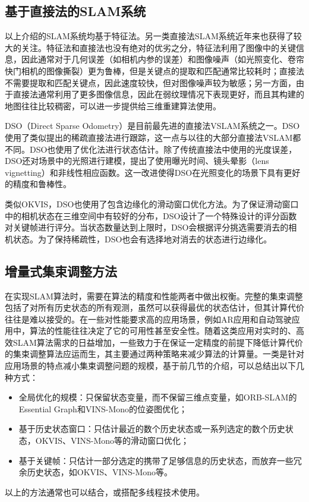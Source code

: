 \subsection{基于直接法的SLAM系统}

以上介绍的SLAM系统均基于特征法。另一类直接法SLAM系统近年来也获得了较大的关注。特征法和直接法也没有绝对的优劣之分，特征法利用了图像中的关键信息，因此通常对于几何误差（如相机内参的误差）和图像噪声（如光照变化、卷帘快门相机的图像撕裂）更为鲁棒，但是关键点的提取和匹配通常比较耗时；直接法不需要提取和匹配关键点，因此速度较快，但对图像噪声较为敏感；另一方面，由于直接法通常利用了更多图像信息，因此在弱纹理情况下表现更好，而且其构建的地图往往比较稠密，可以进一步提供给三维重建算法使用。

DSO（Direct Sparse Odometry）\citep{engel2018direct}是目前最先进的直接法VSLAM系统之一。DSO使用了类似\citep{jin2003semi}提出的稀疏直接法进行跟踪，这一点与以往的大部分直接法VSLAM都不同。DSO也使用了优化法进行状态估计。除了传统直接法中使用的光度误差，DSO还对场景中的光照进行建模，提出了使用曝光时间、镜头晕影（lens vignetting）和非线性相应函数。这一改进使得DSO在光照变化的场景下具有更好的精度和鲁棒性。

类似OKVIS，DSO也使用了包含边缘化的滑动窗口优化方法。为了保证滑动窗口中的相机状态在三维空间中有较好的分布，DSO设计了一个特殊设计的评分函数对关键帧进行评分。当状态数量达到上限时，DSO会根据评分挑选需要消去的相机状态。为了保持稀疏性，DSO也会有选择地对消去的状态进行边缘化。

\subsection{增量式集束调整方法}

在实现SLAM算法时，需要在算法的精度和性能两者中做出权衡。完整的集束调整包括了对所有历史状态的所有观测，虽然可以获得最优的状态估计，但其计算代价往往是难以接受的。在一些对性能要求高的应用场景，例如AR应用和自动驾驶应用中，算法的性能往往决定了它的可用性甚至安全性。随着这类应用对实时的、高效SLAM算法需求的日益增加，一些致力于在保证一定精度的前提下降低计算代价的集束调整算法应运而生，其主要通过两种策略来减少算法的计算量。一类是针对应用场景的特点减小集束调整问题的规模，基于前几节的介绍，可以总结出以下几种方式：
\begin{itemize}
    \item 全局优化的规模：只保留状态变量，而不保留三维点变量，如ORB-SLAM的Essential Graph和VINS-Mono的位姿图优化；
    \item 基于历史状态窗口：只估计最近的数个历史状态或一系列选定的数个历史状态，OKVIS、VINS-Mono等的滑动窗口优化；
    \item 基于关键帧：只估计一部分选定的携带了足够信息的历史状态，而放弃一些冗余历史状态，如OKVIS、VINS-Mono等。
\end{itemize}
以上的方法通常也可以结合，或搭配多线程技术使用。

